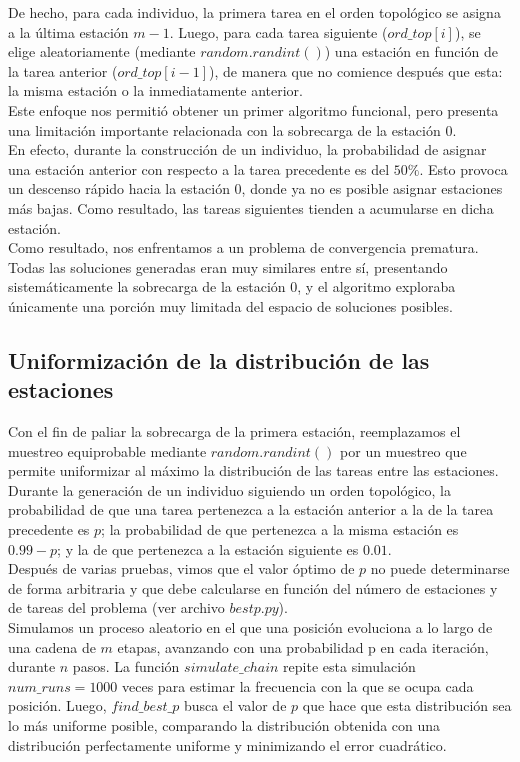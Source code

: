 \documentclass[12pt]{report}
\begin{document}
De hecho, para cada individuo, la primera tarea en el orden topológico se asigna a la última estación $m-1$. Luego, para cada tarea siguiente ($ord\_top[i]$), se elige aleatoriamente (mediante $random.randint()$) una estación en función de la tarea anterior ($ord\_top[i-1]$), de manera que no comience después que esta: la misma estación o la inmediatamente anterior. \\

Este enfoque nos permitió obtener un primer algoritmo funcional, pero presenta una limitación importante relacionada con la sobrecarga de la estación $0$. \\
En efecto, durante la construcción de un individuo, la probabilidad de asignar una estación anterior con respecto a la tarea precedente es del $50\%$. Esto provoca un descenso rápido hacia la estación $0$, donde ya no es posible asignar estaciones más bajas. Como resultado, las tareas siguientes tienden a acumularse en dicha estación.\\

Como resultado, nos enfrentamos a un problema de convergencia prematura. Todas las soluciones generadas eran muy similares entre sí, presentando sistemáticamente la sobrecarga de la estación $0$, y el algoritmo exploraba únicamente una porción muy limitada del espacio de soluciones posibles.


\subsection*{Uniformización de la distribución de las estaciones}

Con el fin de paliar la sobrecarga de la primera estación, reemplazamos el muestreo equiprobable mediante $random.randint()$ por un muestreo que permite uniformizar al máximo la distribución de las tareas entre las estaciones.\\

Durante la generación de un individuo siguiendo un orden topológico, la probabilidad de que una tarea pertenezca a la estación anterior a la de la tarea precedente es $p$; la probabilidad de que pertenezca a la misma estación es $0.99 - p$; y la de que pertenezca a la estación siguiente es $0.01$.\\ 

Después de varias pruebas, vimos que el valor óptimo de $p$ no puede determinarse de forma arbitraria y que debe calcularse en función del número de estaciones y de tareas del problema (ver archivo $bestp.py$).\\
Simulamos un proceso aleatorio en el que una posición evoluciona a lo largo de una cadena de $m$ etapas, avanzando con una probabilidad p en cada iteración, durante $n$ pasos. La función $simulate\_chain$ repite esta simulación $num\_runs = 1000$ veces para estimar la frecuencia con la que se ocupa cada posición. Luego, $find\_best\_p$ busca el valor de $p$ que hace que esta distribución sea lo más uniforme posible, comparando la distribución obtenida con una distribución perfectamente uniforme y minimizando el error cuadrático.
\end{document}
